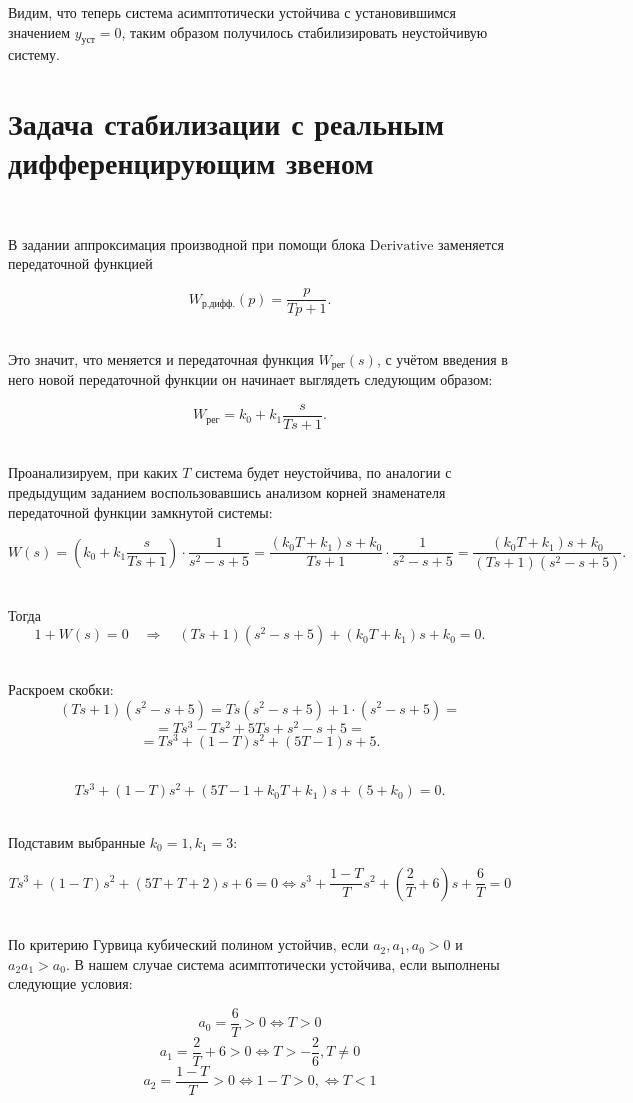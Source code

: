 \documentclass[a4paper]{article}
\begin{document}
Видим, что теперь система асимптотически устойчива с установившимся значением $y_{\text{уст}} = 0$, таким образом получилось стабилизировать неустойчивую систему.

\section{Задача стабилизации с реальным дифференцирующим звеном}\

В задании аппроксимация производной при помощи блока $\text{Derivative}$ заменяется передаточной функцией

$$
W_{\text{р.дифф.}}(p) = \frac{p}{Tp+1}.
$$\

Это значит, что меняется и передаточная функция $W_{\text{рег}}(s)$, с учётом введения в него новой передаточной функции он начинает выглядеть следующим образом:

$$
W_{\text{рег}} = k_0+k_1\frac{s}{Ts+1}.
$$\ 

Проанализируем, при каких $T$ система будет неустойчива, по аналогии с предыдущим заданием воспользовавшись анализом корней знаменателя передаточной функции замкнутой системы:

$$
W(s) = \left(k_0 + k_1 \frac{s}{T s + 1}\right) \cdot \frac{1}{s^2 - s + 5} = \frac{(k_0 T + k_1)s + k_0}{T s + 1}\cdot \frac{1}{s^2 - s + 5} = \frac{(k_0 T + k_1)s + k_0}{(T s + 1)(s^2 - s + 5)}.
$$\

Тогда
$$
1 + W(s) = 0 \quad \Rightarrow \quad (T s + 1)(s^2 - s + 5) + (k_0 T + k_1)s + k_0 = 0.
$$\ 

Раскроем скобки:  
$$
(T s + 1)(s^2 - s + 5) = T s(s^2 - s + 5) + 1\cdot(s^2 - s + 5)=
$$
$$
= T s^3 - T s^2 + 5T s + s^2 - s + 5=
$$
$$
= T s^3 + (1 - T)s^2 + (5T - 1)s + 5.
$$\

$$
T s^3 + (1-T)s^2 + (5T - 1 + k_0 T + k_1)s + (5 + k_0) = 0.
$$\ 

Подставим выбранные $k_0 = 1, k_1 = 3$:

$$
T s^3 + (1-T)s^2 + (5T + T + 2)s + 6 = 0 \Leftrightarrow s^3 + \frac{1-T}{T}s^2 + \left(\frac{2}{T} + 6\right)s + \frac{6}{T} = 0
$$\

По критерию Гурвица кубический полином устойчив, если $a_2, a_1, a_0 > 0$ и $a_2 a_1 > a_0$. В нашем случае система асимптотически устойчива, если выполнены следующие условия:

$$
a_0 = \frac{6}{T} > 0 \Leftrightarrow T > 0
$$
$$
a_1 = \frac{2}{T} + 6 > 0 \Leftrightarrow T > -\frac{2}{6}, T\neq0
$$
$$
a_2 = \frac{1 - T}{T} > 0 \Leftrightarrow 1 - T > 0, \Leftrightarrow T < 1
$$\ 
\end{document}
